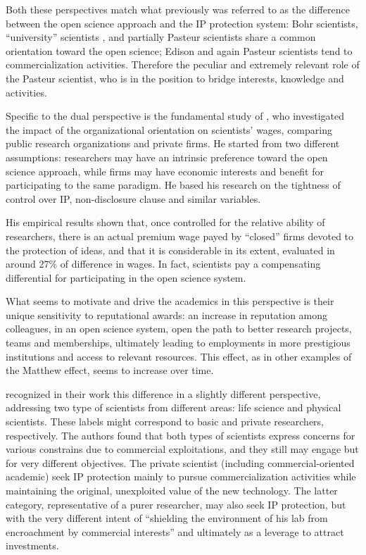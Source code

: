 Both these perspectives match what previously was referred to as the difference between the open science approach and the IP protection system: Bohr scientists, \enquote{university} scientists \citep{Beath2000}, and partially Pasteur scientists share a common orientation toward the open science; Edison and again Pasteur scientists tend to commercialization activities. Therefore the peculiar and extremely relevant role of the Pasteur scientist, who is in the position to bridge interests, knowledge and activities.

Specific to the dual perspective is the fundamental study of \citet{Stern2004}, who investigated the impact of the organizational orientation on scientists' wages, comparing public research organizations and private firms. He started from two different assumptions: researchers may have an intrinsic preference toward the open science approach, while firms may have economic interests and benefit for participating to the same paradigm. He based his research on the tightness of control over IP, non-disclosure clause and similar variables.

His empirical results shown that, once controlled for the relative ability of researchers, there is an actual premium wage payed by \enquote{closed} firms devoted to the protection of ideas, and that it is considerable in its extent, evaluated in around 27\% of difference in wages. In fact, scientists pay a compensating differential for participating in the open science system. 

What seems to motivate and drive the academics in this perspective is their unique sensitivity to reputational awards: an increase in reputation among colleagues, in an open science system, open the path to better research projects, teams and memberships, ultimately leading to employments in more prestigious institutions and access to relevant resources. This effect, as in other examples of the Matthew effect, seems to increase over time.

\citet{OwenSmith2001} recognized in their work this difference in a slightly different perspective, addressing two type of scientists from different areas: life science and physical scientists. These labels might correspond to basic and private researchers, respectively. The authors found that both types of scientists express concerns for various constrains due to commercial exploitations, and they still may engage but for very different objectives. The private scientist (including commercial-oriented academic) seek IP protection mainly to pursue commercialization activities while maintaining the original, unexploited value of the new technology. The latter category, representative of a purer researcher, may also seek IP protection, but with the very different intent of \enquote{shielding the environment of his lab from encroachment by commercial interests} and ultimately as a leverage to attract investments.

